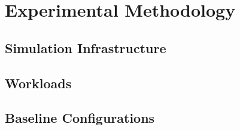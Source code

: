 \section{Experimental Methodology}

\subsection{Simulation Infrastructure}

\subsection{Workloads}

\subsection{Baseline Configurations}

